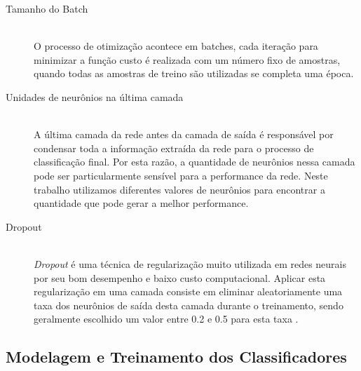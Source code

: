 \begin{description}
  \item[Tamanho do Batch] \hfill \\
        O processo de otimização acontece em batches, cada iteração para minimizar a função custo é realizada com um número fixo de amostras, quando todas as amostras de treino são utilizadas se completa uma época.

  \item[Unidades de neurônios na última camada]
        \hfill \\
        A última camada da rede antes da camada de saída é responsável por condensar toda a informação extraída da rede para o processo de classificação final. Por esta razão, a quantidade de neurônios nessa camada pode ser particularmente sensível para a performance da rede. Neste trabalho utilizamos diferentes valores de neurônios para encontrar a quantidade que pode gerar a melhor performance.

  \item[Dropout]
        \hfill \\
        \emph{Dropout} \cite{dropout} é uma técnica de regularização muito utilizada em redes neurais por seu bom desempenho e baixo custo computacional. Aplicar esta regularização em uma camada consiste em eliminar aleatoriamente uma taxa dos neurônios de saída desta camada durante o treinamento, sendo geralmente escolhido um valor entre 0.2 e 0.5 para esta taxa \cite{CholletBook}.
\end{description}

\subsection{Modelagem e Treinamento dos Classificadores}
\label{section:classificador}

